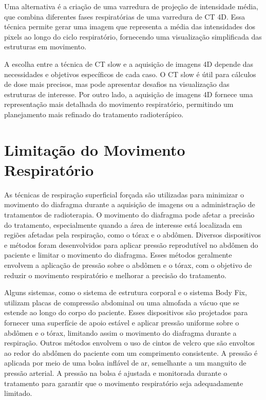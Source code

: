 \documentclass[11pt,a4paper]{article}
\begin{document}
	Uma alternativa é a criação de uma varredura de projeção de intensidade média, que combina diferentes fases respiratórias de uma varredura de CT 4D. Essa técnica permite gerar uma imagem que representa a média das intensidades dos pixels ao longo do ciclo respiratório, fornecendo uma visualização simplificada das estruturas em movimento.

	A escolha entre a técnica de CT slow e a aquisição de imagens 4D depende das necessidades e objetivos específicos de cada caso. O CT slow é útil para cálculos de dose mais precisos, mas pode apresentar desafios na visualização das estruturas de interesse. Por outro lado, a aquisição de imagens 4D fornece uma representação mais detalhada do movimento respiratório, permitindo um planejamento mais refinado do tratamento radioterápico.


\section{Limitação do Movimento Respiratório}

	As técnicas de respiração superficial forçada são utilizadas para minimizar o movimento do diafragma durante a aquisição de imagens ou a administração de tratamentos de radioterapia. O movimento do diafragma pode afetar a precisão do tratamento, especialmente quando a área de interesse está localizada em regiões afetadas pela respiração, como o tórax e o abdômen. Diversos dispositivos e métodos foram desenvolvidos para aplicar pressão reprodutível no abdômen do paciente e limitar o movimento do diafragma. Esses métodos geralmente envolvem a aplicação de pressão sobre o abdômen e o tórax, com o objetivo de reduzir o movimento respiratório e melhorar a precisão do tratamento.

	Alguns sistemas, como o sistema de estrutura corporal e o sistema Body Fix, utilizam placas de compressão abdominal ou uma almofada a vácuo que se estende ao longo do corpo do paciente. Esses dispositivos são projetados para fornecer uma superfície de apoio estável e aplicar pressão uniforme sobre o abdômen e o tórax, limitando assim o movimento do diafragma durante a respiração. Outros métodos envolvem o uso de cintos de velcro que são envoltos ao redor do abdômen do paciente com um comprimento consistente. A pressão é aplicada por meio de uma bolsa inflável de ar, semelhante a um manguito de pressão arterial. A pressão na bolsa é ajustada e monitorada durante o tratamento para garantir que o movimento respiratório seja adequadamente limitado.
\end{document}
